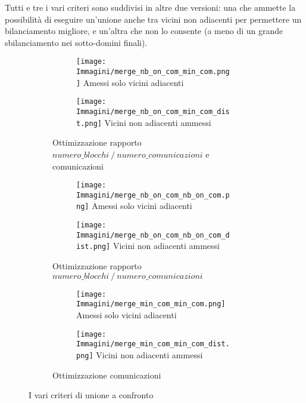 {Tutti e tre i vari criteri sono suddivisi in altre due versioni: una che ammette la possibilità di eseguire un'unione anche tra vicini non adiacenti per permettere un bilanciamento migliore, e un'altra che non lo consente (a meno di un grande sbilanciamento nei sotto-domini finali).\\
\begin{figure}[H]
	\centering
	\begin{subfigure}{1.0\textwidth}
	\centering
		\begin{subfigure}{0.5\textwidth}
			\centering
			\texttt{[image: Immagini/merge\_nb\_on\_com\_min\_com.png]}
			Amessi solo vicini adiacenti
		\end{subfigure}%
		\begin{subfigure}{0.5\textwidth}
			\centering
			\texttt{[image: Immagini/merge\_nb\_on\_com\_min\_com\_dist.png]}
			Vicini non adiacenti ammessi
		\end{subfigure}
	\caption{Ottimizzazione rapporto $numero\_blocchi\mathbin{/}numero\_comunicazioni$ e comunicazioni\newline}
	\label{fig:nb_comm}
	\end{subfigure}
	\begin{subfigure}{1.0\textwidth}
	\centering
		\begin{subfigure}{0.5\textwidth}
			\centering
			\texttt{[image: Immagini/merge\_nb\_on\_com\_nb\_on\_com.png]}
			Amessi solo vicini adiacenti
		\end{subfigure}%
		\begin{subfigure}{0.5\textwidth}
			\centering
			\texttt{[image: Immagini/merge\_nb\_on\_com\_nb\_on\_com\_dist.png]}
			Vicini non adiacenti ammessi
		\end{subfigure}
	\caption{Ottimizzazione rapporto $numero\_blocchi\mathbin{/}numero\_comunicazioni$\newline}
	\label{fig:nb_nb}
	\end{subfigure}
	\begin{subfigure}{1.0\textwidth}
	\centering
	\begin{subfigure}{0.5\textwidth}
		\centering
		\texttt{[image: Immagini/merge\_min\_com\_min\_com.png]}
		Amessi solo vicini adiacenti
	\end{subfigure}%
	\begin{subfigure}{0.5\textwidth}
		\centering
		\texttt{[image: Immagini/merge\_min\_com\_min\_com\_dist.png]}
		Vicini non adiacenti ammessi
	\end{subfigure}
	\caption{Ottimizzazione comunicazioni\newline}
	\label{fig:comm_comm}
\end{subfigure}
	\caption{I vari criteri di unione a confronto}
\end{figure}

}
